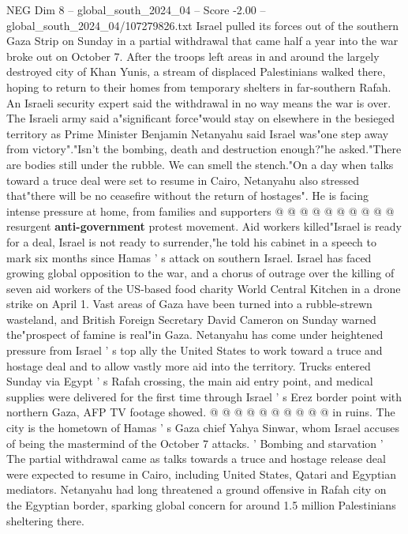 \begin{textsample}{NEG Dim 8 – global\_south\_2024\_04 – Score -2.00 – global\_south\_2024\_04/107279826.txt}  \label{ex:f8_neg_030}
Israel pulled its forces out of the southern Gaza Strip on Sunday in a partial withdrawal that came half a year into the war broke out on October 7.
After the troops left areas in and around the largely destroyed city of Khan Yunis, a stream of displaced Palestinians walked there, hoping to return to their homes from temporary shelters in far-southern Rafah.
An Israeli security expert said the withdrawal in no way means the war is over.
The Israeli army said a"significant force"would stay on elsewhere in the besieged territory as Prime Minister Benjamin Netanyahu said Israel was"one step away from victory"."Isn't the bombing, death and destruction enough?"he asked."There are bodies still under the rubble.
We can smell the stench."On a day when talks toward a truce deal were set to resume in Cairo, Netanyahu also stressed that"there will be no ceasefire without the return of hostages".
He is facing intense pressure at home, from families and supporters @ @ @ @ @ @ @ @ @ @ resurgent \textbf{anti-government} protest movement.
Aid workers killed"Israel is ready for a deal, Israel is not ready to surrender,"he told his cabinet in a speech to mark six months since Hamas ' s attack on southern Israel.
Israel has faced growing global opposition to the war, and a chorus of outrage over the killing of seven aid workers of the US-based food charity World Central Kitchen in a drone strike on April 1.
Vast areas of Gaza have been turned into a rubble-strewn wasteland, and British Foreign Secretary David Cameron on Sunday warned the"prospect of famine is real"in Gaza.
Netanyahu has come under heightened pressure from Israel ' s top ally the United States to work toward a truce and hostage deal and to allow vastly more aid into the territory.
Trucks entered Sunday via Egypt ' s Rafah crossing, the main aid entry point, and medical supplies were delivered for the first time through Israel ' s Erez border point with northern Gaza, AFP TV footage showed. @ @ @ @ @ @ @ @ @ @ in ruins.
The city is the hometown of Hamas ' s Gaza chief Yahya Sinwar, whom Israel accuses of being the mastermind of the October 7 attacks. ' Bombing and starvation ' The partial withdrawal came as talks towards a truce and hostage release deal were expected to resume in Cairo, including United States, Qatari and Egyptian mediators.
Netanyahu had long threatened a ground offensive in Rafah city on the Egyptian border, sparking global concern for around 1.5 million Palestinians sheltering there.

\end{textsample}
